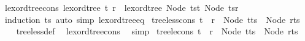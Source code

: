 \begin{isabellebody}
\isanewline
{}\isamarkupfalse%
\ lexord{\isacharunderscore}{\kern0pt}tree{\isacharunderscore}{\kern0pt}cons{}{\isacharcolon}{\kern0pt}\ {\isachardoublequoteopen}lexord{\isacharunderscore}{\kern0pt}tree\ t\ r\ {\isasymlongleftrightarrow}\ lexord{\isacharunderscore}{\kern0pt}tree\ {\isacharparenleft}{\kern0pt}Node\ {\isacharparenleft}{\kern0pt}ts{\isacharat}{\kern0pt}{\isacharbrackleft}{\kern0pt}t{\isacharbrackright}{\kern0pt}{\isacharparenright}{\kern0pt}{\isacharparenright}{\kern0pt}\ {\isacharparenleft}{\kern0pt}Node\ {\isacharparenleft}{\kern0pt}ts{\isacharat}{\kern0pt}{\isacharbrackleft}{\kern0pt}r{\isacharbrackright}{\kern0pt}{\isacharparenright}{\kern0pt}{\isacharparenright}{\kern0pt}{\isachardoublequoteclose}\isanewline
%
\isadelimproof
\ \ %
\endisadelimproof
%
\isatagproof
{}\isamarkupfalse%
\ {\isacharparenleft}{\kern0pt}induction\ ts{\isacharparenright}{\kern0pt}\ {\isacharparenleft}{\kern0pt}auto\ simp{\isacharcolon}{\kern0pt}\ lexord{\isacharunderscore}{\kern0pt}tree{\isacharunderscore}{\kern0pt}eq{\isacharparenright}{\kern0pt}%
\endisatagproof
{\isafoldproof}%
%
\isadelimproof
\isanewline
%
\endisadelimproof
\isanewline
{}\isamarkupfalse%
\ tree{\isacharunderscore}{\kern0pt}less{\isacharunderscore}{\kern0pt}cons{}{\isacharcolon}{\kern0pt}\ {\isachardoublequoteopen}t\ {\isacharless}{\kern0pt}\ r\ {\isasymlongleftrightarrow}\ Node\ {\isacharparenleft}{\kern0pt}t{\isacharhash}{\kern0pt}ts{\isacharparenright}{\kern0pt}\ {\isacharless}{\kern0pt}\ Node\ {\isacharparenleft}{\kern0pt}r{\isacharhash}{\kern0pt}ts{\isacharparenright}{\kern0pt}{\isachardoublequoteclose}\isanewline
%
\isadelimproof
\ \ %
\endisadelimproof
%
\isatagproof
{}\isamarkupfalse%
\ tree{\isacharunderscore}{\kern0pt}less{\isacharunderscore}{\kern0pt}def\ \isamarkupfalse%
\ lexord{\isacharunderscore}{\kern0pt}tree{\isacharunderscore}{\kern0pt}cons{}\ \isamarkupfalse%
\ simp%
\endisatagproof
{\isafoldproof}%
%
\isadelimproof
\isanewline
%
\endisadelimproof
\isanewline
{}\isamarkupfalse%
\ tree{\isacharunderscore}{\kern0pt}le{\isacharunderscore}{\kern0pt}cons{}{\isacharcolon}{\kern0pt}\ {\isachardoublequoteopen}t\ {\isasymle}\ r\ {\isasymlongleftrightarrow}\ Node\ {\isacharparenleft}{\kern0pt}t{\isacharhash}{\kern0pt}ts{\isacharparenright}{\kern0pt}\ {\isasymle}\ Node\ {\isacharparenleft}{\kern0pt}r{\isacharhash}{\kern0pt}ts{\isacharparenright}{\kern0pt}{\isachardoublequoteclose}\isanewline
%
\isadelimproof
\ \ %
\endisadelimproof

\end{isabellebody}
